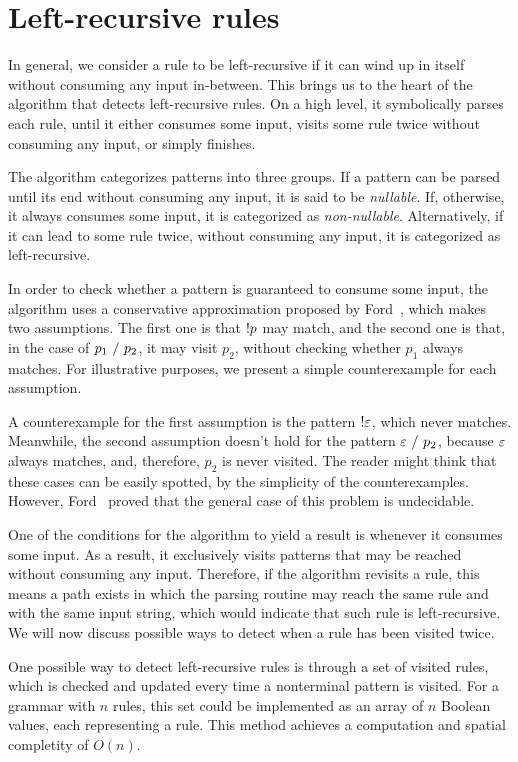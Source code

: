 \section{Left-recursive rules}
\label{section:lr-rules}

In general,
we consider a rule to be left-recursive
if it can wind up in itself
without consuming any input in-between.
This brings us to the heart
of the algorithm that
detects left-recursive rules.
On a high level,
it symbolically parses each rule,
until it either consumes some input,
visits some rule twice without consuming any input,
or simply finishes.

The algorithm categorizes patterns into three groups.
If a pattern can be parsed until its end without consuming any input,
it is said to be \emph{nullable}.
If, otherwise, it always consumes some input,
it is categorized as \emph{non-nullable}.
Alternatively, if it can lead to some rule twice,
without consuming any input,
it is categorized as left-recursive.

In order to check whether a pattern
is guaranteed to consume some input,
the algorithm uses a conservative approximation
proposed by Ford~\cite{ford_parsing_2004},
which makes two assumptions.
The first one is that $!p$ may match,
and the second one is that,
in the case of $p_1\ /\ p_2$,
it may visit $p_2$,
without checking whether $p_1$ always matches.
For illustrative purposes,
we present a simple counterexample
for each assumption.

A counterexample for the first assumption
is the pattern $!\varepsilon$,
which never matches.
Meanwhile, the second assumption doesn't hold
for the pattern $\varepsilon\ /\ p_2$,
because $\varepsilon$ always matches,
and, therefore, $p_2$ is never visited.
The reader might think that
these cases can be easily spotted,
by the simplicity of the counterexamples.
However,
Ford~\cite{ford_parsing_2004} proved that
the general case of this problem is undecidable.

One of the conditions for the algorithm to yield a result
is whenever it consumes some input.
As a result,
it exclusively visits patterns that may be reached
without consuming any input.
Therefore, if the algorithm revisits a rule,
this means a path exists in which
the parsing routine may reach the same rule
and with the same input string,
which would indicate that such rule is left-recursive.
We will now discuss possible ways to detect
when a rule has been visited twice.

One possible way to detect left-recursive rules
is through a set of visited rules,
which is checked and updated
every time a nonterminal pattern is visited.
For a grammar with $n$ rules,
this set could be implemented
as an array of $n$ Boolean values,
each representing a rule.
This method achieves
a computation and spatial
completity of $O(n)$.

